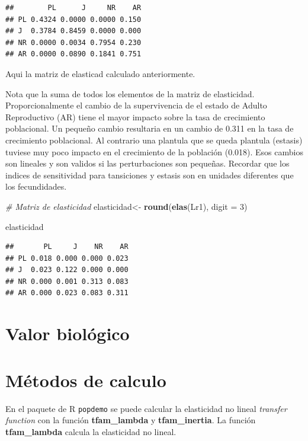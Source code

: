 \documentclass[
]{book}
\newenvironment{Shaded}{\begin{snugshade}}{\end{snugshade}}
\newcommand{\AttributeTok}[1]{\textcolor[rgb]{0.13,0.29,0.53}{#1}}
\newcommand{\CommentTok}[1]{\textcolor[rgb]{0.56,0.35,0.01}{\textit{#1}}}
\newcommand{\DecValTok}[1]{\textcolor[rgb]{0.00,0.00,0.81}{#1}}
\newcommand{\FunctionTok}[1]{\textcolor[rgb]{0.13,0.29,0.53}{\textbf{#1}}}
\newcommand{\NormalTok}[1]{#1}
\newcommand{\OtherTok}[1]{\textcolor[rgb]{0.56,0.35,0.01}{#1}}
\theoremstyle{definition}
\theoremstyle{definition}
\theoremstyle{definition}
\theoremstyle{definition}
\theoremstyle{remark}
\begin{document}
\begin{verbatim}
##        PL      J     NR    AR
## PL 0.4324 0.0000 0.0000 0.150
## J  0.3784 0.8459 0.0000 0.000
## NR 0.0000 0.0034 0.7954 0.230
## AR 0.0000 0.0890 0.1841 0.751
\end{verbatim}

Aqui la matriz de elasticad calculado anteriormente.

Nota que la suma de todos los elementos de la matriz de elasticidad. Proporcionalmente el cambio de la supervivencia de el estado de Adulto Reproductivo (AR) tiene el mayor impacto sobre la tasa de crecimiento poblacional. Un pequeño cambio resultaria en un cambio de 0.311 en la tasa de crecimiento poblacional. Al contrario una plantula que se queda plantula (estasis) tuviese muy poco impacto en el crecimiento de la población (0.018). Esos cambios son lineales y son validos si las perturbaciones son pequeñas. Recordar que los indices de sensitividad para tansiciones y estasis son en unidades diferentes que los fecundidades.

\begin{Shaded}
\begin{Highlighting}[]
 \CommentTok{\# Matriz de elasticidad}
\NormalTok{elasticidad}\OtherTok{\textless{}{-}} \FunctionTok{round}\NormalTok{(}\FunctionTok{elas}\NormalTok{(Lr1), }\AttributeTok{digit =} \DecValTok{3}\NormalTok{)}

\NormalTok{elasticidad}
\end{Highlighting}
\end{Shaded}

\begin{verbatim}
##       PL     J    NR    AR
## PL 0.018 0.000 0.000 0.023
## J  0.023 0.122 0.000 0.000
## NR 0.000 0.001 0.313 0.083
## AR 0.000 0.023 0.083 0.311
\end{verbatim}

\section{Valor biológico}\label{valor-bioluxf3gico}

\section{Métodos de calculo}\label{muxe9todos-de-calculo}

En el paquete de R \texttt{popdemo} se puede calcular la elasticidad no lineal \emph{transfer function} con la función \textbf{tfam\_lambda} y \textbf{tfam\_inertia}. La función \textbf{tfam\_lambda} calcula la elasticidad no lineal.
\end{document}
